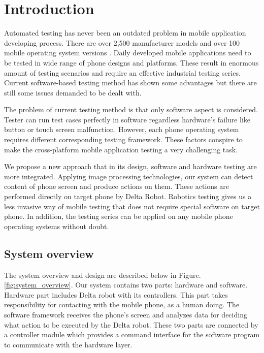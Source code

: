 \makeatletter
\def\maxwidth#1{\ifdim\Gin@nat@width>#1 #1\else\Gin@nat@width\fi}
\makeatother

\chapter{Introduction}

Automated testing has never been an outdated problem in mobile application developing process. There are over 2,500 manufacturer models and over 100 mobile operating system versions \cite{crittercism}. Daily developed mobile applications need to be tested in wide range of phone designs and platforms. These result in enormous amount of testing scenarios and require an effective industrial testing series. Current software-based testing method has shown some advantages but there are still some issues demanded to be dealt with.

The problem of current testing method is that only software aspect is considered. Tester can run test cases perfectly in software regardless hardware's failure like button or touch screen malfunction. However, each phone operating system requires different corresponding testing framework. These factors conspire to make the cross-platform mobile application testing a very challenging task. \nocite{weinman_thesis}

We propose a new approach that in its design, software and hardware testing are more integrated. Applying image processing technologies, our system can detect content of phone screen and produce actions on them. These actions are performed directly on target phone by Delta Robot. Robotics testing gives us a less invasive way of mobile testing that does not require special software on target phone. In addition, the testing series can be applied on any mobile phone operating systems without doubt.

\section{System overview}

The system overview and design are described below in Figure.\ref{fig:system_overview}.
Our system contains two parts: hardware and software. Hardware part includes Delta robot with its controllers. This part takes responsibility for contacting with the mobile phone, as a human doing. The software framework receives the phone's screen and analyzes data for deciding what action to be executed by the Delta robot. These two parts are connected by a controller module which provides a command interface for the software program to communicate with the hardware layer.

